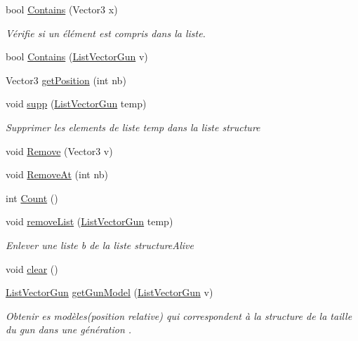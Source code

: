 \begin{DoxyCompactItemize}
bool \mbox{\hyperlink{class_list_vector_gun_afacf0a838223ed57e72abcc7c21594ae}{Contains}} (Vector3 x)
\begin{DoxyCompactList}\small\item\em Vérifie si un élément est compris dans la liste. \end{DoxyCompactList}\item 
bool \mbox{\hyperlink{class_list_vector_gun_a6cff6d5a51a605010ca4ced8ef89e8c2}{Contains}} (\mbox{\hyperlink{class_list_vector_gun}{List\+Vector\+Gun}} v)
\item 
Vector3 \mbox{\hyperlink{class_list_vector_gun_a6b94b7d8288d1415f1670181251bbfa2}{get\+Position}} (int nb)
\item 
void \mbox{\hyperlink{class_list_vector_gun_a92aa301df19a9b1cd5f6e635e6a0c86f}{supp}} (\mbox{\hyperlink{class_list_vector_gun}{List\+Vector\+Gun}} temp)
\begin{DoxyCompactList}\small\item\em Supprimer les elements de liste temp dans la liste structure \end{DoxyCompactList}\item 
void \mbox{\hyperlink{class_list_vector_gun_a88c192bd1bdd5b6fb48ec38eb9ee8711}{Remove}} (Vector3 v)
\item 
void \mbox{\hyperlink{class_list_vector_gun_a1ffc9f3c2ac48631dcd05ba8061ba9c7}{Remove\+At}} (int nb)
\item 
int \mbox{\hyperlink{class_list_vector_gun_a7c7706a2171becc86a8353b525d35d69}{Count}} ()
\item 
void \mbox{\hyperlink{class_list_vector_gun_a81d2c8a06d61648f274eb644901f1959}{remove\+List}} (\mbox{\hyperlink{class_list_vector_gun}{List\+Vector\+Gun}} temp)
\begin{DoxyCompactList}\small\item\em Enlever une liste b de la liste structure\+Alive \end{DoxyCompactList}\item 
void \mbox{\hyperlink{class_list_vector_gun_ad89b2534e45d190049c9a922de5df655}{clear}} ()
\item 
\mbox{\hyperlink{class_list_vector_gun}{List\+Vector\+Gun}} \mbox{\hyperlink{class_list_vector_gun_ad93bd26e0c5d5e71ff75acfb43edd5c3}{get\+Gun\+Model}} (\mbox{\hyperlink{class_list_vector_gun}{List\+Vector\+Gun}} v)
\begin{DoxyCompactList}\small\item\em Obtenir es modèles(position relative) qui correspondent à la structure de la taille du gun dans une génération . \end{DoxyCompactList}\item 

\end{DoxyCompactItemize}
